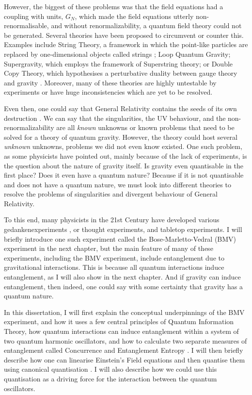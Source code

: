\documentclass[12pt,a4paper]{report}
\theoremstyle{plain}
\theoremstyle{definition}
\theoremstyle{remark}
\begin{document}
However, the biggest of these problems was that the field equations had a coupling with units, $G_N$, which made the field equations utterly non-renormalisable, and without renormalizability, a quantum field theory could not be generated. Several theories have been proposed to circumvent or counter this. Examples include String Theory, a framework in which the point-like particles are replaced by one-dimensional objects called strings \cite{Tong_2009}; Loop Quantum Gravity; Supergravity, which employs the framework of Superstring theory; or Double Copy Theory, which hypothesises a perturbative duality between gauge theory and gravity \cite{DoubleCopy}. Moreover, many of these theories are highly untestable by experiments or have huge inconsistencies which are yet to be resolved.

Even then, one could say that General Relativity contains the seeds of its own destruction \cite{Tong_2009}. We can say that the singularities, the UV behaviour, and the non-renormalizability are all \textit{known} unknowns or known problems that need to be solved for a theory of quantum gravity. However, the theory could host several \textit{unknown} unknowns, problems we did not even know existed. One such problem, as some physicists have pointed out, mainly because of the lack of experiments, is the question about the nature of gravity itself. Is gravity even quantisable in the first place? Does it even have a quantum nature? Because if it is not quantisable and does not have a quantum nature, we must look into different theories to resolve the problems of singularities and divergent behaviour of General Relativity.

To this end, many physicists in the 21st Century have developed various gedankenexperiments \cite{PhysRevD.98.126009, doi:10.1142/S0218271819430016}, or thought experiments, and tabletop experiments. I will briefly introduce one such experiment called the Bose-Marletto-Vedral (BMV) \cite{Bose_2017, Marletto_2017} experiment in the next chapter, but the main feature of many of these experiments, including the BMV experiment, include entanglement due to gravitational interactions. This is because all quantum interactions induce entanglement, as I will also show in the next chapter. And if gravity can induce entanglement, then indeed, one could say with some certainty that gravity has a quantum nature.

In this dissertation, I will first explain the conceptual underpinnings of the BMV experiment, and how it uses a few central principles of Quantum Information Theory, how quantum interactions can induce entanglement within a system of two quantum harmonic oscillators, and how to calculate two separate measures of entanglement called Concurrence and Entanglement Entropy \cite{Bose_2022}. I will then briefly describe how one can linearise Einstein's Field equations and then quantise them using canonical quantisation \cite{Gupta_1952}. I will also describe how we could use this quantisation as a driving force for the interaction between the quantum oscillators.
\end{document}
